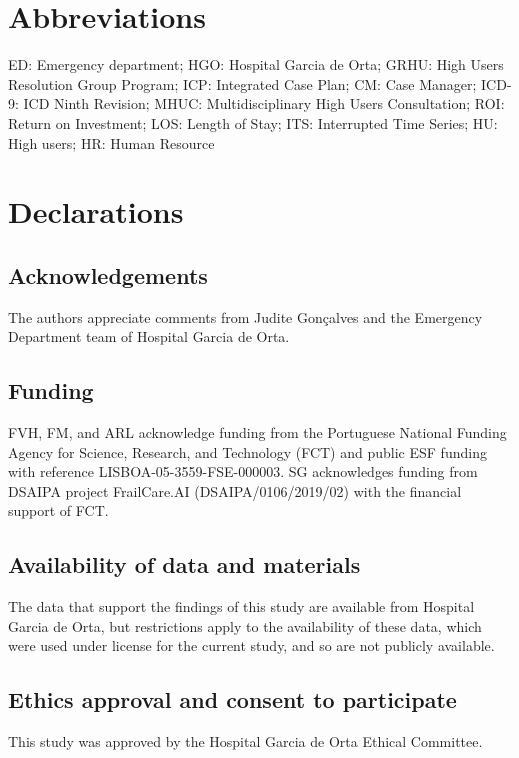 \documentclass{bmcart}
\begin{document}
\section*{Abbreviations}%
ED: Emergency department; HGO: Hospital Garcia de Orta; GRHU: High Users Resolution Group Program; ICP: Integrated Case Plan; CM: Case Manager; ICD-9: ICD Ninth Revision; MHUC: Multidisciplinary High Users Consultation; ROI: Return on Investment; LOS: Length of Stay; ITS: Interrupted Time Series; HU: High users; HR: Human Resource

\section*{Declarations}

\subsection*{Acknowledgements}
The authors appreciate comments from Judite Gonçalves and the Emergency Department team of Hospital Garcia de Orta. 

\subsection*{Funding}
FVH, FM, and ARL acknowledge funding from the Portuguese National Funding Agency for Science, Research, and Technology (FCT) and public ESF funding with reference LISBOA-05-3559-FSE-000003. SG acknowledges funding from DSAIPA project FrailCare.AI (DSAIPA/0106/2019/02) with the financial support of FCT.

\subsection*{Availability of data and materials}%
The data that support the findings of this study are available from Hospital Garcia de Orta, but
restrictions apply to the availability of these data, which were used under
license for the current study, and so are not publicly available. 

\subsection*{Ethics approval and consent to participate}%
This study was approved by the Hospital Garcia de Orta Ethical Committee.
\end{document}
